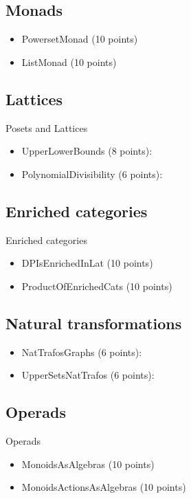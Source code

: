 \subsection{Monads}

\begin{itemize}
    \item PowersetMonad (10 points)  
    \item ListMonad (10 points) 
\end{itemize}




\subsection{Lattices}

Posets and Lattices
\begin{itemize}
    \item UpperLowerBounds (8 points): 
    \item PolynomialDivisibility (6 points):  
\end{itemize}

\subsection{Enriched categories}
Enriched categories
\begin{itemize}
    \item DPIsEnrichedInLat (10 points)  
    \item ProductOfEnrichedCats (10 points) 
\end{itemize}


\subsection{Natural transformations}

\begin{itemize}
    \item NatTrafosGraphs (6 points): 
    \item UpperSetsNatTrafos (6 points): 
\end{itemize}


\subsection{Operads}

Operads
\begin{itemize}
    \item MonoidsAsAlgebras (10 points)  
    \item MonoidsActionsAsAlgebras (10 points) 
\end{itemize}

